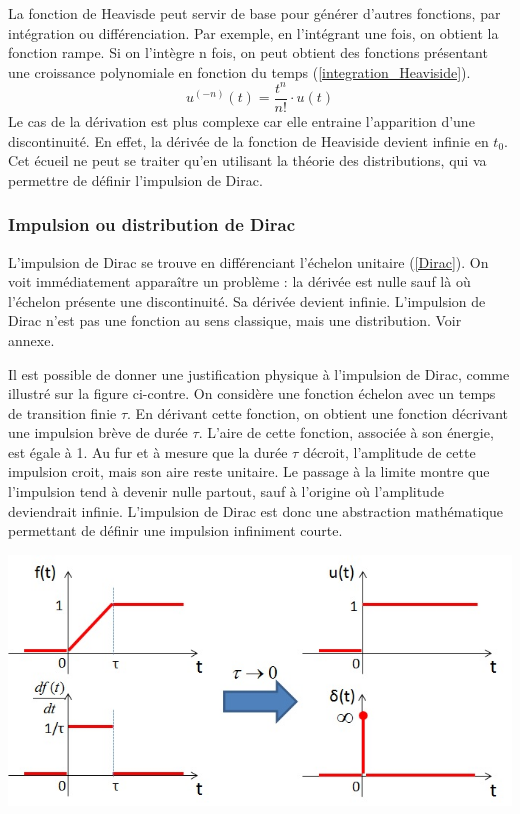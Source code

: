 \documentclass[]{report}
\begin{document}
	La fonction de Heavisde peut servir de base pour générer d'autres fonctions, par intégration ou différenciation. Par exemple, en l'intégrant une fois, on obtient la fonction rampe. Si on l'intègre n fois, on peut obtient des fonctions présentant une croissance polynomiale en fonction du temps (\ref{integration_Heaviside}). 
	\begin{equation}\label{integration_Heaviside}
	u^{(-n)}(t) = \frac{t^{n}}{n!} \cdot u(t)	 	
	\end{equation}	
	Le cas de la dérivation est plus complexe car elle entraine l'apparition d'une discontinuité. En effet, la dérivée de la fonction de Heaviside devient infinie en $t_{0}$. Cet écueil ne peut se traiter qu'en utilisant la théorie des distributions, qui va permettre de définir l'impulsion de Dirac.
	
	\subsubsection{Impulsion ou distribution de Dirac}
	
	L'impulsion de Dirac se trouve en différenciant l'échelon unitaire (\ref{Dirac}). On
	voit immédiatement apparaître un problème : la dérivée est nulle sauf là
	où l'échelon présente une discontinuité. Sa dérivée devient infinie.
	L'impulsion de Dirac n'est pas une fonction au sens classique, mais une
	distribution. Voir annexe. 

	
	\begin{minipage}[l]{0.45\linewidth}
			Il est possible de donner une justification physique à l'impulsion de Dirac, comme illustré sur la figure ci-contre. On considère une fonction échelon avec un temps de transition finie $\tau$. En dérivant cette fonction, on obtient une fonction décrivant une impulsion brève de durée $\tau$. L'aire de cette fonction, associée à son énergie, est égale à 1. Au fur et à mesure que la durée $\tau$ décroit, l'amplitude de cette impulsion croit, mais son aire reste unitaire. Le passage à la limite montre que l'impulsion tend à devenir nulle partout, sauf à l'origine où l'amplitude deviendrait infinie. L'impulsion de Dirac est donc une abstraction mathématique permettant de définir une impulsion infiniment courte.	
	\end{minipage} \hfill
	\begin{minipage}[r]{0.55\linewidth}
		\includegraphics[scale=0.5]{images/generation_Dirac.jpg} 	
	\end{minipage}
	\vspace{0.5\baselineskip}
	
\end{document}
